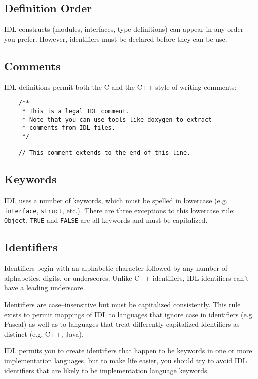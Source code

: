 \subsection{Definition Order}
IDL constructs (modules, interfaces, type definitions) can appear in any order
you prefer.
However, identifiers must be declared before they can be use.


\subsection{Comments}
IDL definitions permit both the C and the C++ style of writing comments:
\begin{verbatim}
    /**
     * This is a legal IDL comment.
     * Note that you can use tools like doxygen to extract
     * comments from IDL files.
     */

    // This comment extends to the end of this line.
\end{verbatim}


\subsection{Keywords}
IDL uses a number of keywords, which must be spelled in lowercase (e.g. {\tt
interface}, {\tt struct}, etc.).
There are three exceptions to this lowercase rule: {\tt Object}, {\tt TRUE} and
{\tt FALSE} are all keywords and must be capitalized.

\subsection{Identifiers}
Identifiers begin with an alphabetic character followed by any number of
alphabetics, digits, or underscores. Unlike C++ identifiers, IDL identifiers
can't have a leading underscore.

\vspace{2mm}
Identifiers are case--insensitive but must be capitalized consistently. 
This rule exists to permit mappings of IDL to languages that ignore case in
identifiers (e.g. Pascal) as well as to languages that treat differently
capitalized identifiers as distinct (e.g. C++, Java).

\vspace{2mm}
IDL permits you to create identifiers that happen to be keywords in one or more
implementation languages, but to make life easier, you should try to avoid IDL
identifiers that are likely to be implementation language keywords.

